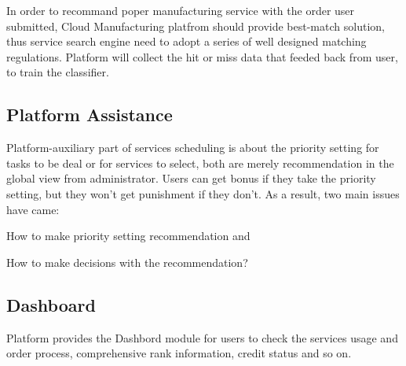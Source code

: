 In order to recommand poper manufacturing service with the order user submitted, Cloud Manufacturing platfrom should provide best-match solution, thus service search engine need to adopt a series of well designed matching regulations. Platform will collect the hit or miss data that feeded back from user, to train the classifier.

\subsection{Platform Assistance} %
\label{sub:platform_assistance}
Platform-auxiliary part of services scheduling is about the priority setting for tasks to be deal or for services to select, both are merely recommendation in the global view from administrator. Users can get bonus if they take the priority setting, but they won't get punishment if they don't.
As a result, two main issues have came: \begin{inparaenum}[1)]
\item How to make priority setting recommendation and
\item How to make decisions with the recommendation?
\end{inparaenum}

\subsection{Dashboard} %
\label{sub:service_dashboard}
Platform provides the Dashbord module for users to check the services usage and order process, comprehensive rank information, credit status and so on.
